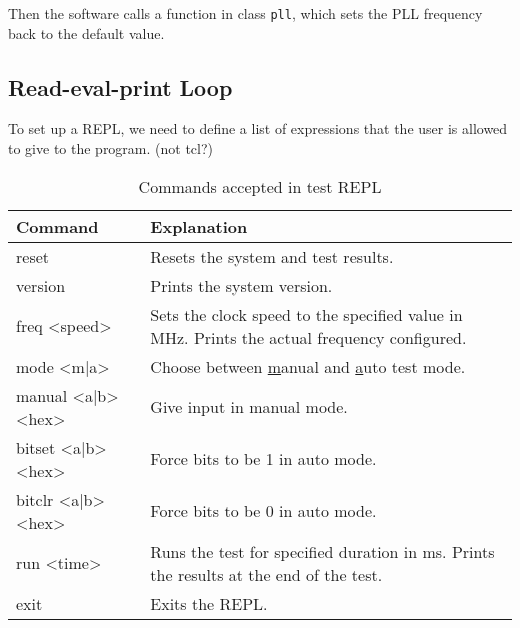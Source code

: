 Then the software calls a function in class \texttt{pll}, which sets the PLL frequency back to the default value.


\subsection{Read-eval-print Loop}

To set up a REPL, we need to define a list of expressions that the user is allowed to give to the program. (not tcl?)
\begin{table}[H]
  \centering
  \begin{tabular}{|>{\ttfamily}p{11em}|p{\dimexpr\textwidth-18em}|}
    \hline
    \textrm{Command}   & Explanation \\
    \hline
    reset              & Resets the system and test results. \\
    version            & Prints the system version. \\
    freq <speed>       & Sets the clock speed to the specified value in MHz. Prints the actual frequency configured. \\
    mode <m|a>         & Choose between \underline{m}anual and \underline{a}uto test mode. \\
    manual <a|b> <hex> & Give input in manual mode. \\
    bitset <a|b> <hex> & Force bits to be 1 in auto mode. \\
    bitclr <a|b> <hex> & Force bits to be 0 in auto mode. \\
    run <time>         & Runs the test for specified duration in ms. Prints the results at the end of the test. \\
    exit               & Exits the REPL. \\
    \hline
  \end{tabular}
  \caption{Commands accepted in test REPL}
\end{table}
